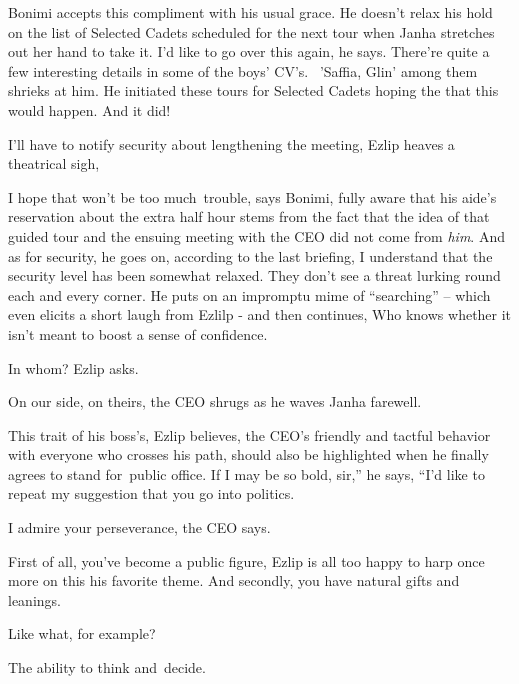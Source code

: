 \documentclass[letterpaper]{article}
\begin{document}
Bonimi accepts this compliment with his usual grace. He doesn't relax his hold on the list of Selected
Cadets{ }scheduled for the next tour when Janha stretches out her hand to take it. {\textquotedbl}I'd
like to go over this again,{\textquotedbl} he says. {\textquotedbl}There're quite a few interesting details in some of
the boys' CV's.{\textquotedbl} \ {}'Saffia, Glin' among them shrieks at him. He initiated these tours for Selected
Cadets hoping the that this would happen. And{ }it did!~~ 

{\textquotedbl} I'll have to notify security about lengthening the meeting,{\textquotedbl} Ezlip heaves a theatrical
sigh,

{\textquotedbl}I hope that won't be too much~trouble,{\textquotedbl} says Bonimi, fully aware that his aide's
reservation about the extra half hour stems from the fact that the idea of that guided tour and the{
}ensuing meeting with the CEO did not come from \textit{him}. {\textquotedbl}And as for security,{\textquotedbl} he
goes on, {\textquotedbl}according to the last briefing, I understand that the security level has been somewhat relaxed.
They don't see a threat lurking round each and every corner.{\textquotedbl} He puts on an impromptu mime of
``searching'' -- which even elicits a short laugh from Ezlilp - and then continues, {\textquotedbl}Who knows whether it
isn't meant to boost a sense of confidence.{\textquotedbl} 

{\textquotedbl}In whom?{\textquotedbl} Ezlip asks. 

{\textquotedbl}On our side, on theirs,{\textquotedbl} the CEO shrugs as he waves Janha farewell.

This trait of his boss's, Ezlip believes,{ }the CEO's friendly and tactful
behavior with everyone who crosses his path, should also be highlighted when he finally agrees to stand for~public
office. {\textquotedbl}If I may be so bold, sir,'' he says, ``I'd like to repeat my suggestion that you go into
politics.{\textquotedbl} 

{\textquotedbl}I admire your perseverance,{\textquotedbl} the CEO says. 

{\textquotedbl}First of all, you've become a public figure,{\textquotedbl} Ezlip is all too happy to harp once more on
this his favorite theme. {\textquotedbl}And secondly, you have natural gifts and leanings.{\textquotedbl} 

{\textquotedbl}Like what, for example?{\textquotedbl} 

{\textquotedbl}The ability to think and~decide.{\textquotedbl} 
\end{document}
